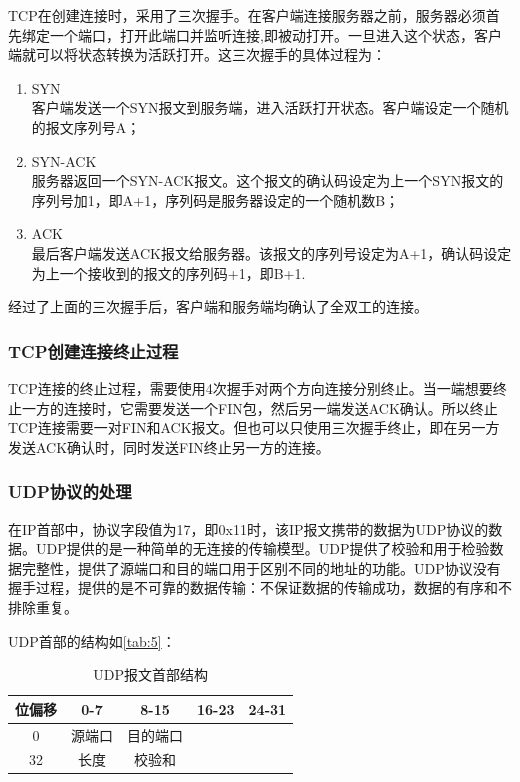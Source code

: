 \documentclass[format=final, language=chinese, degree=fyp]{hustthesis}
\begin{document}
TCP在创建连接时，采用了三次握手。在客户端连接服务器之前，服务器必须首先绑定一个端口，打开此端口并监听连接,即被动打开。一旦进入这个状态，客户端就可以将状态转换为活跃打开。这三次握手的具体过程为：

\begin{enumerate}
	\item SYN \\ 客户端发送一个SYN报文到服务端，进入活跃打开状态。客户端设定一个随机的报文序列号A；
	\item SYN-ACK \\ 服务器返回一个SYN-ACK报文。这个报文的确认码设定为上一个SYN报文的序列号加1，即A+1，序列码是服务器设定的一个随机数B；
	\item ACK \\ 最后客户端发送ACK报文给服务器。该报文的序列号设定为A+1，确认码设定为上一个接收到的报文的序列码+1，即B+1.
\end{enumerate}

经过了上面的三次握手后，客户端和服务端均确认了全双工的连接。


\subsubsection{TCP创建连接终止过程}

TCP连接的终止过程，需要使用4次握手对两个方向连接分别终止。当一端想要终止一方的连接时，它需要发送一个FIN包，然后另一端发送ACK确认。所以终止TCP连接需要一对FIN和ACK报文。但也可以只使用三次握手终止，即在另一方发送ACK确认时，同时发送FIN终止另一方的连接。

\subsubsection{UDP协议的处理}
在IP首部中，协议字段值为17，即0x11时，该IP报文携带的数据为UDP协议的数据。UDP提供的是一种简单的无连接的传输模型。UDP提供了校验和用于检验数据完整性，提供了源端口和目的端口用于区别不同的地址的功能。UDP协议没有握手过程，提供的是不可靠的数据传输：不保证数据的传输成功，数据的有序和不排除重复。

    
UDP首部的结构如\autoref{tab:5}：

\begin{table}[h!]
\centering
\caption{UDP报文首部结构}\label{tab:5}
\begin{tabular}{|c|c|c|c|c|}
	\hline
	位偏移 & 0-7 & 8-15 & 16-23 & 24-31\\\hline
	0 & 源端口 & 目的端口 \\\hline
	32 & 长度 & 校验和  \\\hline
	\end{tabular}
\end{table}
\end{document}
